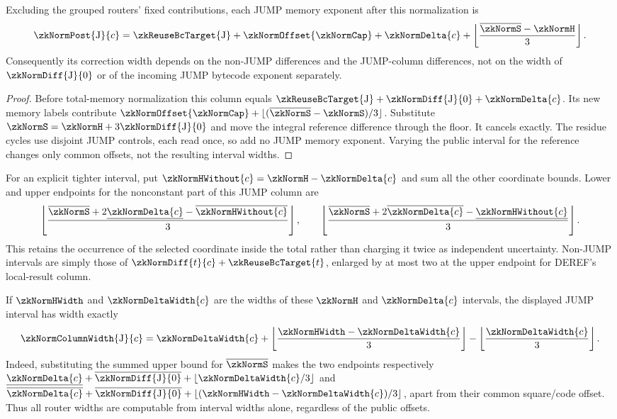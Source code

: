 \begin{lemma}\label{lem:zk-jump-count-cancellation}
Excluding the grouped routers' fixed contributions, each JUMP memory exponent after this normalization is
\[
 \zkNormPost{\mathrm J}{c}
 =\zkReuseBcTarget{\mathrm J}+\zkNormOffset{\zkNormCap}
  +\zkNormDelta{c}
  +\left\lfloor\frac{\overline{\zkNormS}-\zkNormH}{3}\right\rfloor.
\]
Consequently its correction width depends on the non-JUMP differences and the JUMP-column differences, not on the width of $\zkNormDiff{\mathrm J}{0}$ or of the incoming JUMP bytecode exponent separately.
\end{lemma}
\begin{proof}
Before total-memory normalization this column equals $\zkReuseBcTarget{\mathrm J}+\zkNormDiff{\mathrm J}{0}+\zkNormDelta{c}$. Its new memory labels contribute $\zkNormOffset{\zkNormCap}+\lfloor(\overline{\zkNormS}-\zkNormS)/3\rfloor$. Substitute $\zkNormS=\zkNormH+3\zkNormDiff{\mathrm J}{0}$ and move the integral reference difference through the floor. It cancels exactly. The residue cycles use disjoint JUMP controls, each read once, so add no JUMP memory exponent. Varying the public interval for the reference changes only common offsets, not the resulting interval widths.
\end{proof}

For an explicit tighter interval, put $\zkNormHWithout{c}=\zkNormH-\zkNormDelta{c}$ and sum all the other coordinate bounds. Lower and upper endpoints for the nonconstant part of this JUMP column are
\[
 \left\lfloor\frac{\overline{\zkNormS}+2\underline{\zkNormDelta{c}}-\overline{\zkNormHWithout{c}}}{3}\right\rfloor,
 \qquad
 \left\lfloor\frac{\overline{\zkNormS}+2\overline{\zkNormDelta{c}}-\underline{\zkNormHWithout{c}}}{3}\right\rfloor.
\]
This retains the occurrence of the selected coordinate inside the total rather than charging it twice as independent uncertainty. Non-JUMP intervals are simply those of $\zkNormDiff{t}{c}+\zkReuseBcTarget{t}$, enlarged by at most two at the upper endpoint for DEREF's local-result column.

If $\zkNormHWidth$ and $\zkNormDeltaWidth{c}$ are the widths of these $\zkNormH$ and $\zkNormDelta{c}$ intervals, the displayed JUMP interval has width exactly
\[
 \zkNormColumnWidth{\mathrm J}{c}
 =\zkNormDeltaWidth{c}
   +\left\lfloor\frac{\zkNormHWidth-\zkNormDeltaWidth{c}}3\right\rfloor
   -\left\lfloor\frac{\zkNormDeltaWidth{c}}3\right\rfloor.
\]
Indeed, substituting the summed upper bound for $\overline{\zkNormS}$ makes the two endpoints respectively $\underline{\zkNormDelta{c}}+\overline{\zkNormDiff{\mathrm J}{0}}+\lfloor\zkNormDeltaWidth{c}/3\rfloor$ and $\overline{\zkNormDelta{c}}+\overline{\zkNormDiff{\mathrm J}{0}}+\lfloor(\zkNormHWidth-\zkNormDeltaWidth{c})/3\rfloor$, apart from their common square/code offset. Thus all router widths are computable from interval widths alone, regardless of the public offsets.


